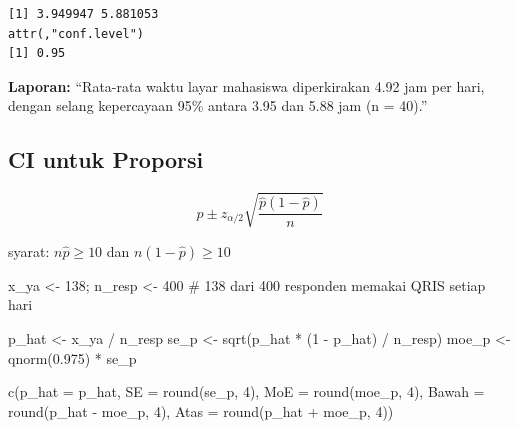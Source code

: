\documentclass[
  indonesian,
  letterpaper,
]{book}
\newenvironment{Shaded}{\begin{snugshade}}{\end{snugshade}}
\newcommand{\AttributeTok}[1]{\textcolor[rgb]{0.40,0.45,0.13}{#1}}
\newcommand{\CommentTok}[1]{\textcolor[rgb]{0.37,0.37,0.37}{#1}}
\newcommand{\DecValTok}[1]{\textcolor[rgb]{0.68,0.00,0.00}{#1}}
\newcommand{\FloatTok}[1]{\textcolor[rgb]{0.68,0.00,0.00}{#1}}
\newcommand{\FunctionTok}[1]{\textcolor[rgb]{0.28,0.35,0.67}{#1}}
\newcommand{\NormalTok}[1]{\textcolor[rgb]{0.00,0.23,0.31}{#1}}
\newcommand{\OtherTok}[1]{\textcolor[rgb]{0.00,0.23,0.31}{#1}}
\newcommand{\SpecialCharTok}[1]{\textcolor[rgb]{0.37,0.37,0.37}{#1}}
\begin{document}
\begin{Shaded}
\end{Shaded}

\begin{verbatim}
[1] 3.949947 5.881053
attr(,"conf.level")
[1] 0.95
\end{verbatim}

\textbf{Laporan:} ``Rata-rata waktu layar mahasiswa diperkirakan 4.92
jam per hari, dengan selang kepercayaan 95\% antara 3.95 dan 5.88 jam (n
= 40).''

\subsection{CI untuk Proporsi}\label{ci-untuk-proporsi}

\[
\hat{p} \pm z_{\alpha/2}\sqrt{\frac{\hat{p}(1-\hat{p})}{n}}
\]

syarat: \(n\hat{p} \geq 10\) dan \(n(1-\hat{p}) \geq 10\)

\begin{Shaded}
\begin{Highlighting}[]
\NormalTok{x\_ya }\OtherTok{\textless{}{-}} \DecValTok{138}\NormalTok{; n\_resp }\OtherTok{\textless{}{-}} \DecValTok{400}
\CommentTok{\# 138 dari 400 responden memakai QRIS setiap hari}

\NormalTok{p\_hat }\OtherTok{\textless{}{-}}\NormalTok{ x\_ya }\SpecialCharTok{/}\NormalTok{ n\_resp}
\NormalTok{se\_p }\OtherTok{\textless{}{-}} \FunctionTok{sqrt}\NormalTok{(p\_hat }\SpecialCharTok{*}\NormalTok{ (}\DecValTok{1} \SpecialCharTok{{-}}\NormalTok{ p\_hat) }\SpecialCharTok{/}\NormalTok{ n\_resp)}
\NormalTok{moe\_p }\OtherTok{\textless{}{-}} \FunctionTok{qnorm}\NormalTok{(}\FloatTok{0.975}\NormalTok{) }\SpecialCharTok{*}\NormalTok{ se\_p}

\FunctionTok{c}\NormalTok{(}\AttributeTok{p\_hat =}\NormalTok{ p\_hat, }\AttributeTok{SE =} \FunctionTok{round}\NormalTok{(se\_p, }\DecValTok{4}\NormalTok{), }\AttributeTok{MoE =} \FunctionTok{round}\NormalTok{(moe\_p, }\DecValTok{4}\NormalTok{),}
  \AttributeTok{Bawah =} \FunctionTok{round}\NormalTok{(p\_hat }\SpecialCharTok{{-}}\NormalTok{ moe\_p, }\DecValTok{4}\NormalTok{),}
  \AttributeTok{Atas =} \FunctionTok{round}\NormalTok{(p\_hat }\SpecialCharTok{+}\NormalTok{ moe\_p, }\DecValTok{4}\NormalTok{))}
\end{Highlighting}
\end{Shaded}
\end{document}

